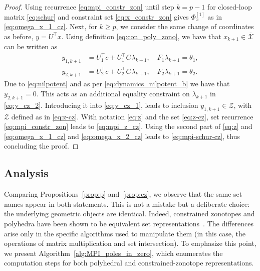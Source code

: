 \documentclass[journal,twoside,web]{ieeecolor}
\begin{document}
\begin{proof}
Using recurrence \eqref{eq:mpi_constr_zon} until step $k=p-1$ for closed-loop matrix \eqref{eq:schur} and constraint set \eqref{eq:x_constr_zon} gives $\Phi_x^{[1]}$ as in \eqref{eq:omega_x_1_cz}. Next, for $k\geq p$, we consider the same change of coordinates as before, $y=U^\top x$. Using definition \eqref{eq:con_poly_zono}, we have that $x_{k+1}\in \overline{\mathcal X}$ can be written as
\begin{subequations}
\label{eq:y_cz}
\begin{align}
\label{eq:y_cz_1}
    y_{1, k+1}&=U_1^\top c + U_1^\top G\lambda_{k+1},\quad F_1\lambda_{k+1} = \theta_1,\\
\label{eq:y_cz_2}
y_{2, k+1}&=U_2^\top c + U_2^\top G\lambda_{k+1},\quad F_2\lambda_{k+1} = \theta_2.
\end{align}    
\end{subequations}
Due to \eqref{eq:nilpotent} and as per \eqref{eq:dynamics_nilpotent_b} we have that $y_{2, k+1}=0$. This acts as an additional equality constraint on $\lambda_{k+1}$ in \eqref{eq:y_cz_2}. Introducing it into \eqref{eq:y_cz_1}, leads to inclusion $y_{1,k+1}\in \mathcal Z$, with $\mathcal Z$ defined as in \eqref{eq:z-cz}. With notation \eqref{eq:z} and the set \eqref{eq:z-cz}, set recurrence \eqref{eq:mpi_constr_zon} leads to \eqref{eq:mpi_z_cz}. Using the second part of \eqref{eq:z} and \eqref{eq:omega_x_1_cz} and \eqref{eq:omega_x_2_cz} leads to \eqref{eq:mpi-schur-cz}, thus concluding the proof.
\end{proof}

\subsection{Analysis}

Comparing Propositions~\ref{prop:p} and~\ref{prop:cz}, we observe that the same set names appear in both statements. This is not a mistake but a deliberate choice: the underlying geometric objects are identical. Indeed, constrained zonotopes and polyhedra have been shown to be equivalent set representations~\cite{raghuraman2022set}. The differences arise only in the specific algorithms used to manipulate them (in this case, the operations of matrix multiplication and set intersection). To emphasize this point, we present Algorithm~\eqref{alg:MPI_poles_in_zero}, which enumerates the computation steps for both polyhedral and constrained-zonotope representations.
\end{document}
